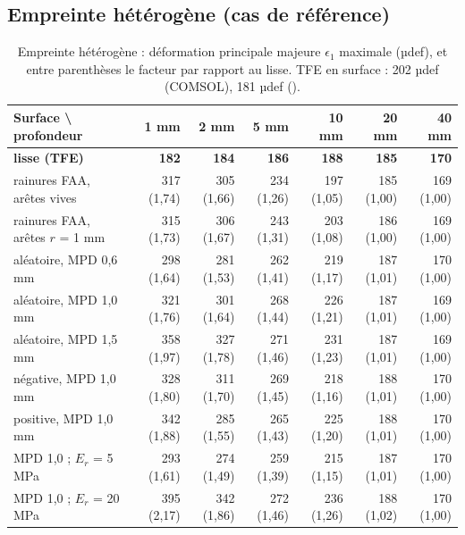 \subsection{Empreinte hétérogène (cas de référence)}
\begin{table}[H]\centering\footnotesize
\caption{Empreinte hétérogène : déformation principale majeure $\epsilon_1$ maximale (µdef), et entre parenthèses le facteur par rapport au lisse. TFE en surface : 202 µdef (COMSOL), 181 µdef (\cs).}\label{tab:het_e1}
\begin{tabular}{lrrrrrr}
\toprule
Surface \textbackslash{} profondeur & 1 mm & 2 mm & 5 mm & 10 mm & 20 mm & 40 mm\\
\midrule
\textbf{lisse (TFE)} & \textbf{182} & \textbf{184} & \textbf{186} & \textbf{188} & \textbf{185} & \textbf{170}\\ \midrule
rainures FAA, arêtes vives & 317 (1,74) & 305 (1,66) & 234 (1,26) & 197 (1,05) & 185 (1,00) & 169 (1,00)\\
rainures FAA, arêtes $r$ = 1 mm & 315 (1,73) & 306 (1,67) & 243 (1,31) & 203 (1,08) & 186 (1,00) & 169 (1,00)\\
aléatoire, MPD 0,6 mm & 298 (1,64) & 281 (1,53) & 262 (1,41) & 219 (1,17) & 187 (1,01) & 170 (1,00)\\
aléatoire, MPD 1,0 mm & 321 (1,76) & 301 (1,64) & 268 (1,44) & 226 (1,21) & 187 (1,01) & 169 (1,00)\\
aléatoire, MPD 1,5 mm & 358 (1,97) & 327 (1,78) & 271 (1,46) & 231 (1,23) & 187 (1,01) & 169 (1,00)\\
négative, MPD 1,0 mm & 328 (1,80) & 311 (1,70) & 269 (1,45) & 218 (1,16) & 188 (1,01) & 170 (1,00)\\
positive, MPD 1,0 mm & 342 (1,88) & 285 (1,55) & 265 (1,43) & 225 (1,20) & 188 (1,01) & 170 (1,00)\\
MPD 1,0 ; $E_r$ = 5 MPa & 293 (1,61) & 274 (1,49) & 259 (1,39) & 215 (1,15) & 187 (1,01) & 170 (1,00)\\
MPD 1,0 ; $E_r$ = 20 MPa & 395 (2,17) & 342 (1,86) & 272 (1,46) & 236 (1,26) & 188 (1,02) & 170 (1,00)\\
\bottomrule
\end{tabular}
\end{table}

